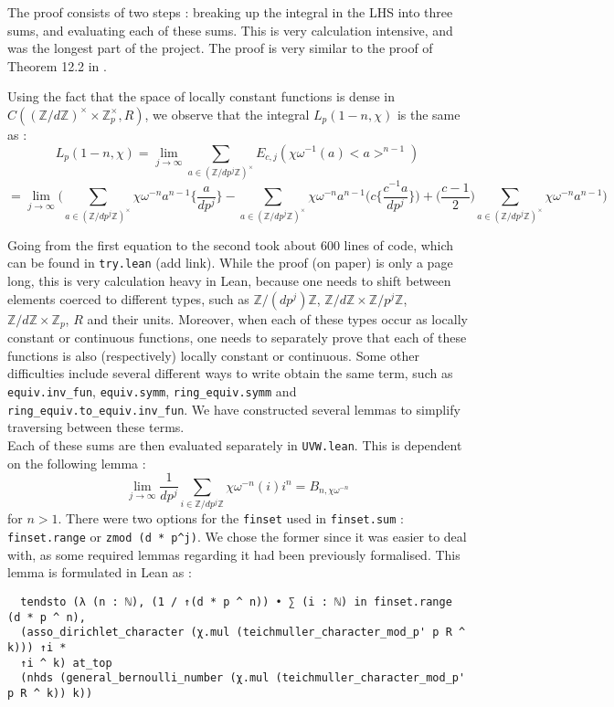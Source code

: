 \documentclass[a4paper,UKenglish,cleveref, autoref, thm-restate]{lipics-v2021}
\newcommand{\lean}[1]{\texttt{#1}\xspace} %
\begin{document}
The proof consists of two steps : breaking up the integral in the LHS into three sums, 
and evaluating each of these sums. This is very calculation intensive, and was the longest part of the project. 
The proof is very similar to the proof of Theorem 12.2 in \cite{cyc}. 

Using the fact that the space of locally constant functions is dense in $C((\mathbb{Z}/d \mathbb{Z})^{\times} \times \mathbb{Z}_p^{\times}, R)$, 
we observe that the integral $L_p (1 - n, \chi)$ is the same as :
$$ L_p (1 - n, \chi) = \lim_{j \to \infty} \sum_{a \in (\mathbb{Z}/ d p^j \mathbb{Z})^{\times}} E_{c, j} (\chi \omega^{-1} (a) <a>^{n - 1}) \label{eqn:1} $$
$$ = \lim_{j \to \infty} \bigg ( \sum_{a \in (\mathbb{Z}/ d p^j \mathbb{Z})^{\times}} \chi \omega^{-n} a^{n - 1} \bigg \{ \frac{a}{d p^j} \bigg \} - 
  \sum_{a \in (\mathbb{Z}/ d p^j \mathbb{Z})^{\times}} \chi \omega^{-n} a^{n - 1} \bigg ( c \bigg \{ \frac{c^{-1} a}{d p^j} \bigg \} \bigg ) 
  + \bigg ( \frac{c - 1}{2} \bigg ) \sum_{a \in (\mathbb{Z}/ d p^j \mathbb{Z})^{\times}} \chi \omega^{-n} a^{n - 1} \bigg ) $$

Going from the first equation to the second took about 600 lines of code, which can be found in \lean{try.lean} (add link). While the proof (on paper) is only a page long, 
this is very calculation heavy in Lean, because one needs to shift between elements coerced to different types, such as $\mathbb{Z}/ (d p^j) \mathbb{Z}$, 
$\mathbb{Z}/ d \mathbb{Z} \times \mathbb{Z}/ p^j \mathbb{Z}$, $\mathbb{Z}/ d \mathbb{Z} \times \mathbb{Z}_p$, $R$ and their units. Moreover, when each of these types occur 
as locally constant or continuous functions, one needs to separately prove that each of these functions 
is also (respectively) locally constant or continuous. Some other difficulties include several different ways to write obtain the same term, such as \lean{equiv.inv\_fun}, 
\lean{equiv.symm}, \lean{ring\_equiv.symm} and \lean{ring\_equiv.to\_equiv.inv\_fun}. We have constructed several lemmas to simplify traversing between these terms. \\

Each of these sums are then evaluated separately in \lean{UVW.lean}. This is dependent on the following lemma : 
$$ \lim_{j \to \infty} \frac{1}{d p^j} \sum_{i \in \mathbb{Z}/ d p^j \mathbb{Z}} \chi \omega^{-n} (i) i^n = B_{n, \chi \omega^{-n}} $$ 
for $n > 1$. There were two options for the \lean{finset} used in \lean{finset.sum} : \lean{finset.range} or \lean{zmod (d * p\textasciicircum j)}. 
We chose the former since it was easier to deal with, as some required lemmas regarding it had been previously formalised. This lemma is 
formulated in Lean as :
\begin{lstlisting}
  tendsto (λ (n : ℕ), (1 / ↑(d * p ^ n)) • ∑ (i : ℕ) in finset.range (d * p ^ n),
  (asso_dirichlet_character (χ.mul (teichmuller_character_mod_p' p R ^ k))) ↑i * 
  ↑i ^ k) at_top
  (nhds (general_bernoulli_number (χ.mul (teichmuller_character_mod_p' p R ^ k)) k))
\end{lstlisting}
\end{document}
